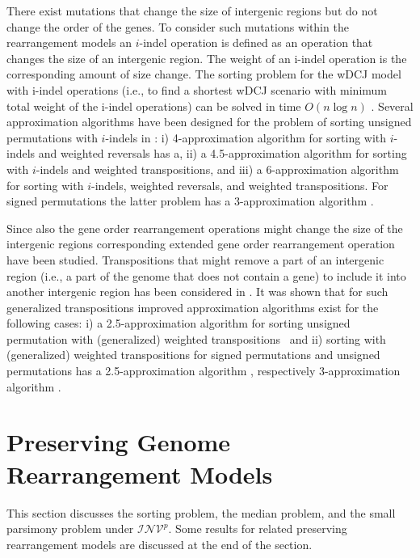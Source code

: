 \documentclass{svmult}
\newcommand{\m}[1]{\mathcal{#1}}
\begin{document}
There exist mutations that change the size of intergenic regions but do not
change the order of the genes. To consider such mutations within the
rearrangement models an $i$-indel operation is defined as an operation that
changes the size of an intergenic region. The weight of an i-indel operation is
the corresponding amount of size change. The sorting problem for the wDCJ model
with i-indel operations (i.e., to find a shortest wDCJ scenario with minimum
total weight of the i-indel operations) can be solved in time $O(n\log n)$ \cite{bulteau2016genome}.
Several approximation algorithms have been designed for the problem of sorting
unsigned permutations with $i$-indels in \cite{alexandrino2021incorporating}: i) 4-approximation algorithm for
sorting with $i$-indels and weighted reversals has a, ii) a 4.5-approximation
algorithm for sorting with $i$-indels and weighted transpositions, and iii) a
6-approximation algorithm for sorting with $i$-indels, weighted reversals, and
weighted transpositions. For signed permutations the latter problem has a
3-approximation algorithm \cite{alexandrino2021reversal}.

Since also the gene order rearrangement operations might change the size of the
intergenic regions corresponding extended gene order rearrangement operation
have been studied. Transpositions that might remove a part of an intergenic
region (i.e., a part of the genome that does not contain a gene) to include it
into another intergenic region has been considered in \cite{oliveira2021sorting,dias2019block}. It was shown that
for such generalized transpositions improved approximation algorithms exist for
the following cases: i) a 2.5-approximation algorithm for sorting unsigned
permutation with (generalized) weighted transpositions~\cite{oliveira2021sorting} and ii) sorting with
(generalized) weighted transpositions for signed permutations and unsigned
permutations has a 2.5-approximation algorithm \cite{oliveira2021sorting}, respectively 3-approximation
algorithm \cite{dias2019block}.

\section{Preserving Genome Rearrangement Models}
\label{sec:preserving_models}


This section discusses the sorting problem, the median problem, and the small parsimony problem under $\m{INV}^{p}$. 
Some results for related preserving rearrangement models are discussed at the end of the section.
\end{document}
